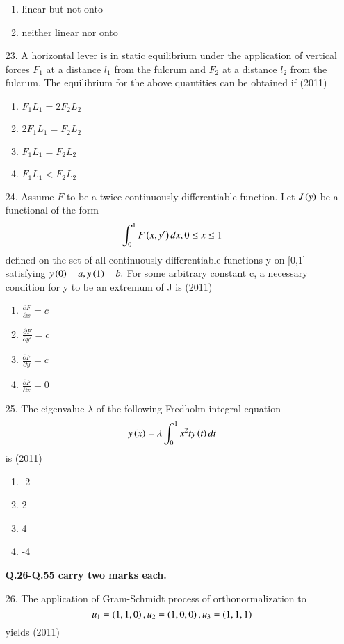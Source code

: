 \documentclass[journal]{IEEEtran}
\begin{document}
\begin{enumerate}
\begin{enumerate}[label=(\Alph*)]
        \item linear but not onto
        \item neither linear nor onto
    \end{enumerate}
    \item[23.] A horizontal lever is in static equilibrium under the application of vertical forces $F_1$ at a distance $l_1$ from the fulcrum and $F_2$ at a distance $l_2$ from the fulcrum. The equilibrium for the above quantities can be obtained if  \hfill (2011)
     \begin{enumerate}[label=(\Alph*)]
        \item $F_1L_1 = 2F_2L_2$
        \item $2F_1L_1 = F_2L_2$
        \item $F_1L_1 = F_2L_2$
        \item $F_1L_1 < F_2L_2$
     \end{enumerate}
    \item[24.] Assume $F$ to be a twice continuously differentiable function. Let $J\left(y\right)$ be a functional of the form $$\int_{0}^{1}F\left(x,y'\right)dx, 0\leq x\leq 1$$ defined on the set of all continuously differentiable functions y on [0,1] satisfying $y\left(0\right)=a,y\left(1\right)=b.$ For some arbitrary constant c, a necessary condition for y to be an extremum of J is   \hfill (2011)
    \begin{enumerate}[label=(\Alph*)]
        \item $\frac{\partial F}{\partial x}=c$
        \item $\frac{\partial F}{\partial y'}=c$
        \item $\frac{\partial F}{\partial y}=c$
        \item $\frac{\partial F}{\partial x}=0$
    \end{enumerate}
    \item[25.] The eigenvalue $\lambda$ of the following Fredholm integral equation $$y\left(x\right)= \lambda\int_{0}^{1}x^2ty\left(t\right)dt$$ is  \hfill (2011)
    \begin{enumerate}[label=(\Alph*)]
        \item -2
        \item 2
        \item 4
        \item -4
    \end{enumerate}
    \textbf{Q.26-Q.55 carry two marks each.}
    \item[26.] The application of Gram-Schmidt process of orthonormalization to $$u_1 = \left(1,1,0\right), u_2=\left(1,0,0\right), u_3 = \left(1,1,1\right)$$ yields  \hfill (2011)

\end{enumerate}
\end{document}
